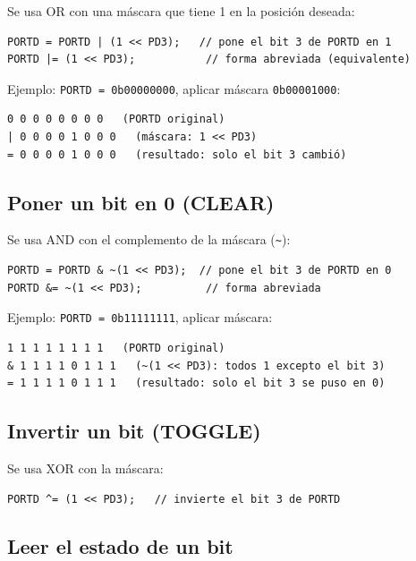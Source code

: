 Se usa OR con una máscara que tiene 1 en la posición deseada:

\begin{lstlisting}[style=estilo-c]
PORTD = PORTD | (1 << PD3);   // pone el bit 3 de PORTD en 1
PORTD |= (1 << PD3);           // forma abreviada (equivalente)
\end{lstlisting}

Ejemplo: \texttt{PORTD = 0b00000000}, aplicar máscara \texttt{0b00001000}:

\begin{lstlisting}[style=estilo-c]
  0 0 0 0 0 0 0 0   (PORTD original)
| 0 0 0 0 1 0 0 0   (máscara: 1 << PD3)
= 0 0 0 0 1 0 0 0   (resultado: solo el bit 3 cambió)
\end{lstlisting}

\subsection{Poner un bit en 0 (CLEAR)}

Se usa AND con el complemento de la máscara (\texttt{\~{}}):

\begin{lstlisting}[style=estilo-c]
PORTD = PORTD & ~(1 << PD3);  // pone el bit 3 de PORTD en 0
PORTD &= ~(1 << PD3);          // forma abreviada
\end{lstlisting}

Ejemplo: \texttt{PORTD = 0b11111111}, aplicar máscara:

\begin{lstlisting}[style=estilo-c]
  1 1 1 1 1 1 1 1   (PORTD original)
& 1 1 1 1 0 1 1 1   (~(1 << PD3): todos 1 excepto el bit 3)
= 1 1 1 1 0 1 1 1   (resultado: solo el bit 3 se puso en 0)
\end{lstlisting}

\subsection{Invertir un bit (TOGGLE)}

Se usa XOR con la máscara:

\begin{lstlisting}[style=estilo-c]
PORTD ^= (1 << PD3);   // invierte el bit 3 de PORTD
\end{lstlisting}

\subsection{Leer el estado de un bit}

